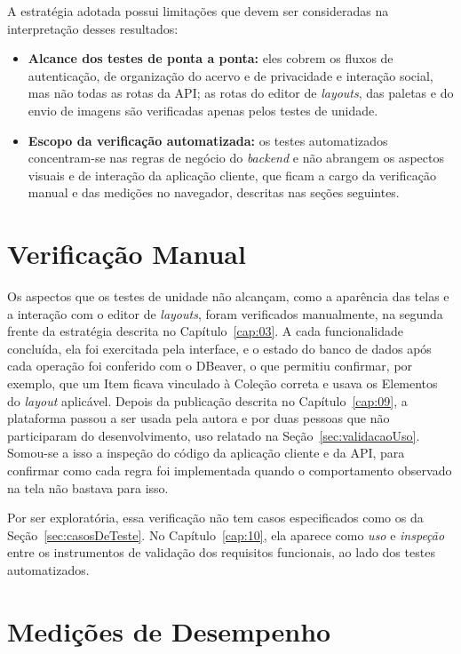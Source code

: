 A estratégia adotada possui limitações que devem ser consideradas na interpretação desses resultados:

\begin{itemize}
    \item \textbf{Alcance dos testes de ponta a ponta:} eles cobrem os fluxos de autenticação, de organização do acervo e de privacidade e interação social, mas não todas as rotas da API; as rotas do editor de \textit{layouts}, das paletas e do envio de imagens são verificadas apenas pelos testes de unidade.
    \item \textbf{Escopo da verificação automatizada:} os testes automatizados concentram-se nas regras de negócio do \textit{backend} e não abrangem os aspectos visuais e de interação da aplicação cliente, que ficam a cargo da verificação manual e das medições no navegador, descritas nas seções seguintes.
\end{itemize}

\section{Verificação Manual}
\label{sec:verificacaoManual}

Os aspectos que os testes de unidade não alcançam, como a aparência das telas e a interação com o editor de \textit{layouts}, foram verificados manualmente, na segunda frente da estratégia descrita no Capítulo~\ref{cap:03}. A cada funcionalidade concluída, ela foi exercitada pela interface, e o estado do banco de dados após cada operação foi conferido com o DBeaver, o que permitiu confirmar, por exemplo, que um Item ficava vinculado à Coleção correta e usava os Elementos do \textit{layout} aplicável. Depois da publicação descrita no Capítulo~\ref{cap:09}, a plataforma passou a ser usada pela autora e por duas pessoas que não participaram do desenvolvimento, uso relatado na Seção~\ref{sec:validacaoUso}. Somou-se a isso a inspeção do código da aplicação cliente e da API, para confirmar como cada regra foi implementada quando o comportamento observado na tela não bastava para isso.

Por ser exploratória, essa verificação não tem casos especificados como os da Seção~\ref{sec:casosDeTeste}. No Capítulo~\ref{cap:10}, ela aparece como \textit{uso} e \textit{inspeção} entre os instrumentos de validação dos requisitos funcionais, ao lado dos testes automatizados.

\section{Medições de Desempenho}
\label{sec:medicoes}

